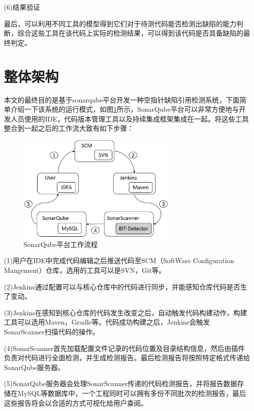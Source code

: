 (6)结果验证

最后，可以利用不同工具的模型得到它们对于待测代码能否检测出缺陷的能力判断，综合这些工具在该代码上实际的检测结果，可以得到该代码是否具备缺陷的最终判定。

\section{整体架构}

本文的最终目的是基于sonarqube平台开发一种空指针缺陷引用检测系统，下面简单介绍一下该系统的运行模式，如图\ref{fig:figure3-2}所示，SonarQube平台可以非常方便地与开发人员使用的IDE，代码版本管理工具以及持续集成框架集成在一起。将这些工具整合到一起之后的工作流大致有如下步骤：

\begin{figure}
	\centering
	\includegraphics[width=0.70\textwidth]{figures/sonarqube3-2}
	\caption{SonarQube平台工作流程}\label{fig:figure3-2}
\end{figure}


(1)用户在IDE中完成代码编辑之后推送代码至SCM（SoftWare Configuration Mangement）仓库，选用的工具可以是SVN，Git等。

(2)Jenkins通过配置可以与核心仓库中的代码进行同步，并能感知仓库代码是否生了变动。

(3)Jenkins在感知到核心仓库的代码发生改变之后，自动触发代码构建动作，构建工具可以选用Maven，Gradle等。代码成功构建之后，Jenkins会触发SonarScanner扫描代码的操作。

(4)SonarScanner首先加载配置文件记录的代码位置及目录结构信息，然后由插件负责对代码进行全面检测，并生成检测报告。最后检测报告将按照特定格式传递给SonarQube服务器。

(5)SonarQube服务器会处理SonarScanner传递的代码检测报告，并将报告数据存储在MySQL等数据库中，一个工程同时可以拥有多份不同批次的检测报告，最后这些报告将会以合适的方式可视化给用户查阅。

